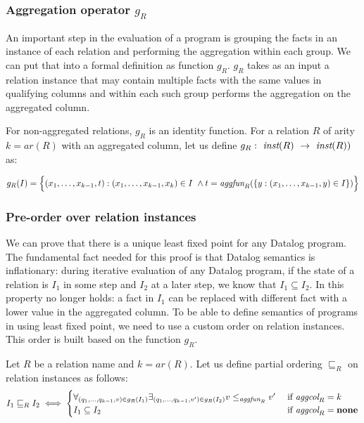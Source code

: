 \subsubsection{Aggregation operator $g_R$}
An important step in the evaluation of a \datalogra program is grouping the facts in an instance of each relation and performing the aggregation within each group. We can put that into a formal definition as function $g_R$. $g_R$ takes as an input a relation instance that may contain multiple facts with the same values in  qualifying columns and within each such group performs the aggregation on the aggregated column.
\begin{defn}\label{d:aggregationoperationgr}
For non-aggregated relations, $g_R$ is an identity function. For a relation $R$ of arity $k = ar(R)$ with an aggregated column, let us define $g_R:~\textit{inst}(R)~\to~\textit{inst}(R))$ as:  

$$g_R(I) = 
       \Big\{(x_1, \dots, x_{k-1}, t): (x_1, \dots, x_{k-1}, x_k) \in I~\wedge t = \textit{aggfun}_R(\{y: (x_1, \dots, x_{k-1}, y) \in I\})\Big\}
$$
\end{defn}

\subsubsection{Pre-order over relation instances}
We can prove that there is a unique least fixed point for any Datalog program. The fundamental fact needed for this proof is that Datalog semantics is inflationary: during iterative evaluation of any Datalog program, if the state of a relation is $I_1$ in some step and $I_2$ at a later step, we know that $I_1 \subseteq I_2$. In \datalogra this property no longer holds: a fact in $I_1$ can be replaced with different fact with a lower value in the aggregated column. To be able to define semantics of programs in \datalogra using least fixed point, we need to use a custom order on relation instances. This order is built based on the function $g_R$.

\begin{defn}
Let $R$ be a relation name and $k=ar(R)$. Let us define partial ordering $\sqsubseteq_R$ on relation instances as follows:
$$
I_1 \sqsubseteq_R I_2 \iff
\begin{cases}
   \forall_{(q_1, ..., q_{k-1}, v) \in g_R(I_1)} \exists_{(q_1, ..., q_{k-1}, v') \in g_R(I_2)} v \le_{\textit{aggfun}_R} v' & \text{ if } \textit{aggcol}_R = k \\
   I_1 \subseteq I_2 & \text{ if } \textit{aggcol}_R = \bf{none} 
\end{cases}
$$
\end{defn}


